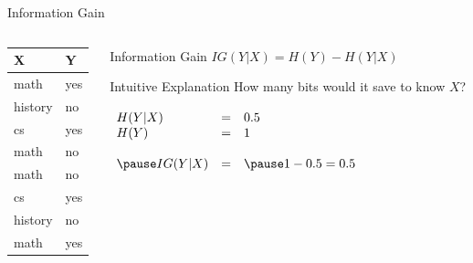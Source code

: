 \documentclass[14pt]{beamer}
\begin{document}
\begin{frame}{Information Gain}
\begin{columns}
\begin{column}{0.25\textwidth}
\begin{tabular}{ll}
X               & Y   \\
\hline
math            & yes \\
history         & no  \\
cs              & yes \\
math            & no  \\
math            & no  \\
cs              & yes \\
history         & no  \\
math            & yes \\
\end{tabular}
\end{column}
\begin{column}{0.7\textwidth}
\setlength{\arraycolsep}{0.25em}
\begin{block}{Information Gain}
$IG(Y|X) = H(Y) - H(Y|X)$
\end{block}
\pause
\begin{block}{Intuitive Explanation}
How many bits would it save to know $X$?
\end{block}
\pause
$
\begin{array}[t]{ l l l }
H(Y|X)  & = & 0.5 \\
H(Y)    & = & 1 \\
\\
\pause
IG(Y|X) & = & \pause 1 - 0.5 = 0.5
\end{array}
$
\end{column}
\end{columns}
\end{frame}
\end{document}
